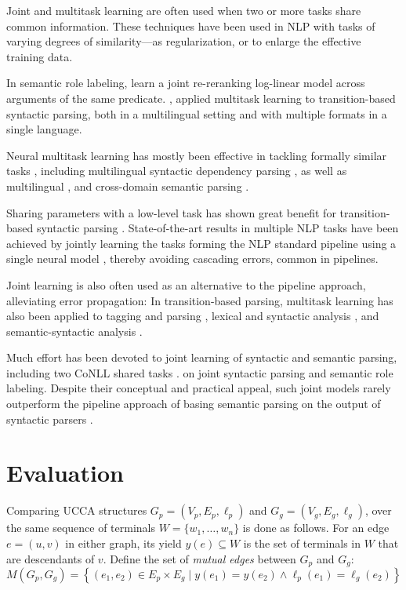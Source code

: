 \documentclass[12pt,a4paper,table]{report}
\renewcommand\cite{\citep}      %
\begin{document}
Joint and multitask learning are often used
when two or more tasks share common information.
These techniques have been used in NLP with tasks of varying degrees of similarity---as
regularization, or to enlarge the effective training data.

In semantic role labeling, \citet{toutanova2005joint}
learn a joint re-reranking log-linear model across arguments of the same predicate.
\citet{Q16-1031}, 
\citet{guo2016exploiting} applied multitask learning to transition-based
syntactic parsing,
both in a multilingual setting and with multiple formats in a single language.

Neural multitask learning has mostly been effective in tackling formally similar
tasks \citep{P16-2038},
including
multilingual syntactic dependency parsing \citep{Q16-1031,guo2016exploiting},
as well as multilingual \citep{duong2017multilingual},
and cross-domain semantic parsing \citep{herzig-berant:2017:Short,W17-2607}.

Sharing parameters with a low-level task
has shown great benefit for transition-based syntactic parsing
\citep{bohnet2012transition,Zhang2016StackpropagationIR,constant-nivre:2016:P16-1,more2016joint}.
State-of-the-art results in multiple NLP tasks have been achieved
by jointly learning the tasks forming the NLP standard pipeline using 
a single neural model \citep{collobert2011natural,D17-1206},
thereby avoiding cascading errors, common in pipelines.

Joint learning is also often used
as an alternative to the pipeline approach, alleviating error propagation:
In transition-based parsing, multitask learning has also been applied to
tagging and parsing \cite{bohnet2012transition,Zhang2016StackpropagationIR},
lexical and syntactic analysis \cite{constant-nivre:2016:P16-1,more2016joint},
and semantic-syntactic analysis \cite{swayamdipta-EtAl:2016:CoNLL,henderson2013multilingual}.

Much effort has been devoted to joint learning of syntactic
and semantic parsing, including
two CoNLL shared tasks \cite{surdeanu2008conll,hajivc2009conll}.
on joint syntactic parsing and semantic role labeling.
Despite their conceptual and practical appeal, such joint models rarely outperform
the pipeline approach of basing semantic parsing on the output of syntactic parsers
\cite{lluis2008joint,henderson2013multilingual,D15-1169,swayamdipta-EtAl:2016:CoNLL,swayamdipta2017frame}.

\section{Evaluation}
Comparing UCCA structures
$G_p=(V_p,E_p,\ell_p)$ and $G_g=(V_g,E_g,\ell_g)$,
over the same sequence of terminals $W = \{w_1,\ldots,w_n\}$
is done as follows.
For an edge $e=(u,v)$ in either graph, its yield $y(e) \subseteq W$ is the
set of terminals in $W$ that are descendants of $v$.
Define the set of \textit{mutual edges} between $G_p$ and $G_g$:
\[
    M(G_p,G_g) =
    \left\{(e_1,e_2) \in E_p \times E_g \;|\;
    y(e_1) = y(e_2) \wedge \ell_p(e_1)=\ell_g(e_2)\right\}
\]
\end{document}
